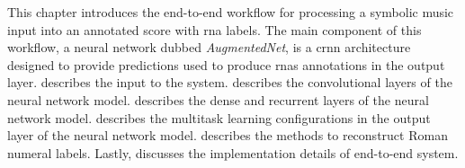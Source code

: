 

This chapter introduces the end-to-end workflow for
processing a symbolic music input into an annotated score
with \gls{rna} labels. The main component of this workflow,
a neural network dubbed \emph{AugmentedNet}, is a \gls{crnn}
architecture designed to provide predictions used to produce
\glspl{rna} annotations in the output layer. 
describes the input to the system.
 describes the
convolutional layers of the neural network model.
 describes the dense and
recurrent layers of the neural network model.
 describes the
multitask learning configurations in the output layer of the
neural network model. 
describes the methods to reconstruct Roman numeral labels.
Lastly,  discusses the implementation
details of end-to-end system.
